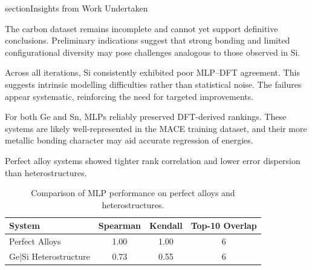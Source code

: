 section{Insights from Work Undertaken} \label{section:insights_from_work}

The carbon dataset remains incomplete and cannot yet support definitive conclusions. Preliminary indications suggest that strong bonding and limited configurational diversity may pose challenges analogous to those observed in Si.

Across all iterations, Si consistently exhibited poor MLP--DFT agreement. This suggests intrinsic modelling difficulties rather than statistical noise. The failures appear systematic, reinforcing the need for targeted improvements.

For both Ge and Sn, MLPs reliably preserved DFT-derived rankings. These systems are likely well-represented in the MACE training dataset, and their more metallic bonding character may aid accurate regression of energies.

Perfect alloy systems showed tighter rank correlation and lower error dispersion than heterostructures.

\begin{table}[h]
    \centering
    \caption{Comparison of MLP performance on perfect alloys and heterostructures.}
    \begin{tabular}{lccc}
        System & Spearman & Kendall & Top-10 Overlap \\
        \hline
        Perfect Alloys & 1.00 & 1.00 & 6 \\
        Ge|Si Heterostructure & 0.73 & 0.55 & 6 \\
    \end{tabular}
\end{table}